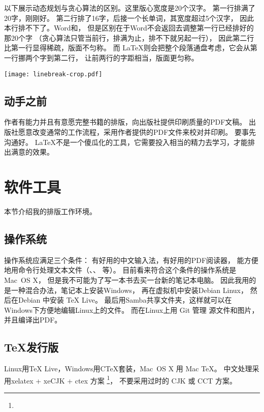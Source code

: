 以下展示动态规划与贪心算法的区别。这里版心宽度是20个汉字。\label{ex:dynamicProgramming}
第一行排满了20字，刚刚好。
第二行排了16字，后接一个长单词，其宽度超过5个汉字，
因此本行排不下了。Word和，
但是区别在于Word不会返回去调整第一行已经排好的那20个字%
（贪心算法只管当前行，排满为止，排不下就另起一行），
因此第二行比第一行显得稀疏，版面不匀称。
而 \LaTeX 则会把整个段落通盘考虑，它会从第一行挪两个字到第二行，
让前两行的字距相当，版面更匀称。

\vspace{1ex}
\centerline{\texttt{[image: linebreak-crop.pdf]}}

\subsection{动手之前}
作者有能力并且有意愿完整书籍的排版，向出版社提供印刷质量的PDF文稿。
出版社愿意改变通常的工作流程，采用作者提供的PDF文件来校对并印刷。
要事先沟通好。
\LaTeX 不是一个傻瓜化的工具，它需要投入相当的精力去学习，才能排出满意的效果。


\section{软件工具}
本节介绍我的排版工作环境。

\subsection{操作系统}

操作系统应满足三个条件：
有好用的中文输入法，有好用的PDF阅读器，
能方便地用命令行处理文本文件（、、 等）。
目前看来符合这个条件的操作系统是Mac~OS X，
但是我不可能为了写一本书去买一台新的笔记本电脑。
因此我用的是一种混合办法，笔记本上安装Windows，
再在虚拟机中安装Debian Linux，
然后在Debian 中安装 TeX Live。
最后用Samba共享文件夹，这样就可以在Windows下方便地编辑Linux上的文件。
而在Linux上用 Git 管理  源文件和图片，并且编译出PDF。

\subsection{\TeX 发行版}
Linux用TeX Live，Windows用CTeX套装，Mac~OS X 用 Mac TeX。
中文处理采用xelatex + xeCJK + ctex 方案
\footnote{}，
不要采用过时的 CJK 或 CCT 方案。

